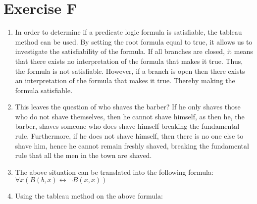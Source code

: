 \section{Exercise F}
\begin{enumerate}
    \item 
    In order to determine if a predicate logic formula is satisfiable, the tableau method can be used. By setting the root formula equal to true, it allows us to investigate the satisfiability of the formula. If all branches are closed, it means that there exists no interpretation of the formula that makes it true. Thus, the formula is not satisfiable. However, if a branch is open then there exists an interpretation of the formula that makes it true. Thereby making the formula satisfiable.  
    \item 
    This leaves the question of who shaves the barber? If he only shaves those who do not shave themselves, then he cannot shave himself, as then he, the barber, shaves someone who does shave himself breaking the fundamental rule. Furthermore, if he does not shave himself, then there is no one else to shave him, hence he cannot remain freshly shaved, breaking the fundamental rule that all the men in the town are shaved.
    \item The above situation can be translated into the following formula: \\
    $ \forall x (B(b,x) \leftrightarrow \neg B(x,x))$
\item 
Using the tableau method on the above formula:
\begin{center}
\begin{tikzpicture}


\end{tikzpicture}
\end{center}
\end{enumerate}
